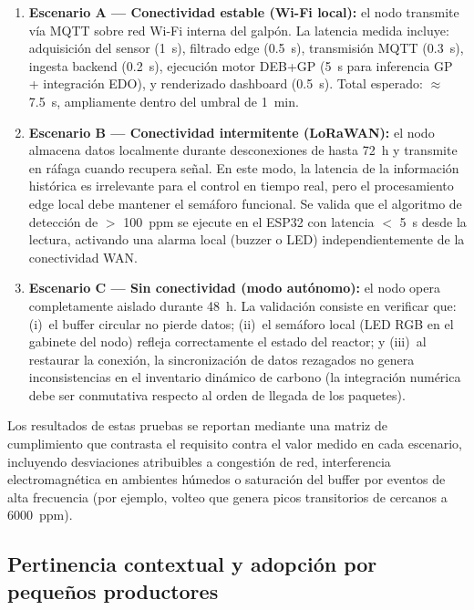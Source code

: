 \begin{enumerate}
    \item \textbf{Escenario A — Conectividad estable (Wi-Fi local):} el nodo transmite vía MQTT sobre red Wi-Fi interna del galpón. La latencia medida incluye: adquisición del sensor (\num{1}~s), filtrado edge (\num{0.5}~s), transmisión MQTT (\num{0.3}~s), ingesta backend (\num{0.2}~s), ejecución motor DEB+GP (\num{5}~s para inferencia GP + integración EDO), y renderizado dashboard (\num{0.5}~s). Total esperado: $\approx$ \num{7.5}~s, ampliamente dentro del umbral de \num{1}~min.
    
    \item \textbf{Escenario B — Conectividad intermitente (LoRaWAN):} el nodo almacena datos localmente durante desconexiones de hasta \num{72}~h y transmite en ráfaga cuando recupera señal. En este modo, la latencia de la información histórica es irrelevante para el control en tiempo real, pero el procesamiento edge local debe mantener el semáforo funcional. Se valida que el algoritmo de detección de  $>$ \num{100}~ppm se ejecute en el ESP32 con latencia $<$ \num{5}~s desde la lectura, activando una alarma local (buzzer o LED) independientemente de la conectividad WAN.
    
    \item \textbf{Escenario C — Sin conectividad (modo autónomo):} el nodo opera completamente aislado durante \num{48}~h. La validación consiste en verificar que: (i)~el buffer circular no pierde datos; (ii)~el semáforo local (LED RGB en el gabinete del nodo) refleja correctamente el estado del reactor; y (iii)~al restaurar la conexión, la sincronización de datos rezagados no genera inconsistencias en el inventario dinámico de carbono (la integración numérica debe ser conmutativa respecto al orden de llegada de los paquetes).
\end{enumerate}

Los resultados de estas pruebas se reportan mediante una matriz de cumplimiento que contrasta el requisito contra el valor medido en cada escenario, incluyendo desviaciones atribuibles a congestión de red, interferencia electromagnética en ambientes húmedos o saturación del buffer por eventos de alta frecuencia (por ejemplo, volteo que genera picos transitorios de  cercanos a \num{6000}~ppm).

\subsection{Pertinencia contextual y adopción por pequeños productores}
\label{subsec:cap5_pertinencia}

